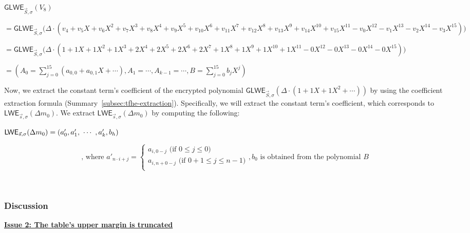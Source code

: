 \begin{enumerate}
$\textsf{GLWE}_{\vec{S}, \sigma}(V_8)$

$ = \textsf{GLWE}_{\vec{S}, \sigma}\bm(\Delta \cdot (v_4 + v_5X + v_6X^2 + v_7X^3 + v_8X^{4} + v_9X^{5} + v_{10}X^{6} + v_{11}X^{7} + v_{12}X^{8} + v_{13}X^{9} + v_{14}X^{10} + v_{15}X^{11} - v_{0}X^{12} - v_{1}X^{13} - v_{2}X^{14} - v_{3}X^{15})\bm)$

$ = \textsf{GLWE}_{\vec{S}, \sigma}\bm(\Delta\cdot(1 + 1X + 1X^2 + 1X^3 + 2X^{4} + 2X^{5} + 2X^{6} + 2X^{7} + 1X^{8} + 1X^{9} + 1X^{10} + 1X^{11} - 0X^{12} - 0X^{13} - 0X^{14} - 0X^{15})\bm)$

$ = \left(A_0 = \sum\limits_{j=0}^{15}(a_{0,0} + a_{0,1}X + \cdots), A_1 = \cdots, A_{k-1} = \cdots, B = \sum\limits_{j=0}^{15}b_{j}X^j\right)$

Now, we extract the constant term's coefficient of the encrypted polynomial $\textsf{GLWE}_{\vec{S}, \sigma}(\Delta \cdot (1 + 1X + 1X^2 + \cdots))$ by using the coefficient extraction formula (Summary~\ref{subsec:tfhe-extraction}). Specifically, we will extract the constant term's coefficient, which corresponds to $\textsf{LWE}_{\vec{s}, \sigma}(\Delta m_0)$. We extract $\textsf{LWE}_{\vec{s}, \sigma}(\Delta m_0)$ by computing the following:

$\textsf{LWE}_{\vec{s}, \sigma}(\Delta m_0) = (a_0', a_1', \text{ } \text{$\cdots$} \text{ } , a_k', b_h)$

\[
    \text{, where } a'_{n \cdot i + j} =   
\begin{cases}
    a_{i,0 - j} \text{ (if } 0 \leq j \leq 0\text{)}\\
    a_{i,n + 0 - j} \text{ (if } 0+1 \leq j \leq n-1\text{)}\\
\end{cases}
, b_0 \text{ is obtained from the polynomial } B
\]


\end{enumerate}






$ $

\subsubsection{Discussion}
\label{subsubsec:polynomial-ring-discuss}


\underline{\textbf{Issue 2: The table's upper margin is truncated}}

